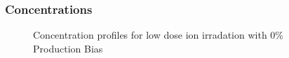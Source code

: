 \documentclass[a4paper]{article}
\begin{document}
    \subsubsection{Concentrations}
      \begin{figure}[h!]  %
        \centering
        \qquad
        \caption{Concentration profiles for low dose ion irradation with 0\% Production Bias}
        \label{figure:concentrations_ion_0_1e-6}
      \end{figure}
\end{document}
